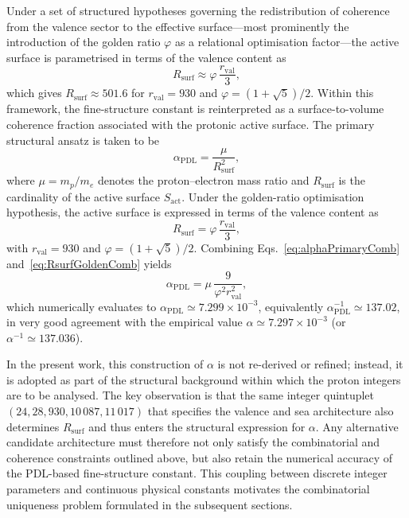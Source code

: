 \documentclass[11pt,a4paper]{article}
\begin{document}
Under a set of structured hypotheses governing the redistribution of coherence from the valence sector to the effective surface—most prominently the introduction of the golden ratio $\varphi$ as a relational optimisation factor—the active surface is parametrised in terms of the valence content as
\begin{equation}
R_{\mathrm{surf}} \approx \varphi\,\frac{r_{\mathrm{val}}}{3},
\end{equation}
which gives $R_{\mathrm{surf}}\approx 501.6$ for $r_{\mathrm{val}}=930$ and $\varphi=(1+\sqrt{5})/2$.\cite{LaubscherDerivationAlpha2026,LaubscherGoldenRatioPDL2026} Within this framework, the fine-structure constant is reinterpreted as a surface-to-volume coherence fraction associated with the protonic active surface.
The primary structural ansatz is taken to be
\begin{equation}
\alpha_{\mathrm{PDL}} = \frac{\mu}{R_{\mathrm{surf}}^{2}},
\label{eq:alphaPrimaryComb}
\end{equation}
where $\mu = m_p/m_e$ denotes the proton–electron mass ratio and $R_{\mathrm{surf}}$ is the cardinality of the active surface $S_{\mathrm{act}}$.
Under the golden-ratio optimisation hypothesis, the active surface is expressed in terms of the valence content as
\begin{equation}
R_{\mathrm{surf}} = \varphi\,\frac{r_{\mathrm{val}}}{3},
\label{eq:RsurfGoldenComb}
\end{equation}
with $r_{\mathrm{val}} = 930$ and $\varphi = (1+\sqrt{5})/2$.\cite{LaubscherDerivationAlpha2026}
Combining Eqs.~\eqref{eq:alphaPrimaryComb} and~\eqref{eq:RsurfGoldenComb} yields
\begin{equation}
\alpha_{\mathrm{PDL}} = \mu\,\frac{9}{\varphi^{2} r_{\mathrm{val}}^{2}},
\label{eq:alphaValenceComb}
\end{equation}
which numerically evaluates to
$\alpha_{\mathrm{PDL}} \simeq 7.299\times 10^{-3}$,
equivalently
$\alpha_{\mathrm{PDL}}^{-1} \simeq 137.02$,
in very good agreement with the empirical value $\alpha \simeq 7.297\times 10^{-3}$ (or $\alpha^{-1} \simeq 137.036$).\cite{LaubscherDerivationAlpha2026}

In the present work, this construction of $\alpha$ is not re-derived or refined; instead, it is adopted as part of the structural background within which the proton integers are to be analysed. The key observation is that the same integer quintuplet $(24,28,930,10\,087,11\,017)$ that specifies the valence and sea architecture also determines $R_{\mathrm{surf}}$ and thus enters the structural expression for $\alpha$. Any alternative candidate architecture must therefore not only satisfy the combinatorial and coherence constraints outlined above, but also retain the numerical accuracy of the PDL-based fine-structure constant. This coupling between discrete integer parameters and continuous physical constants motivates the combinatorial uniqueness problem formulated in the subsequent sections.
\end{document}
